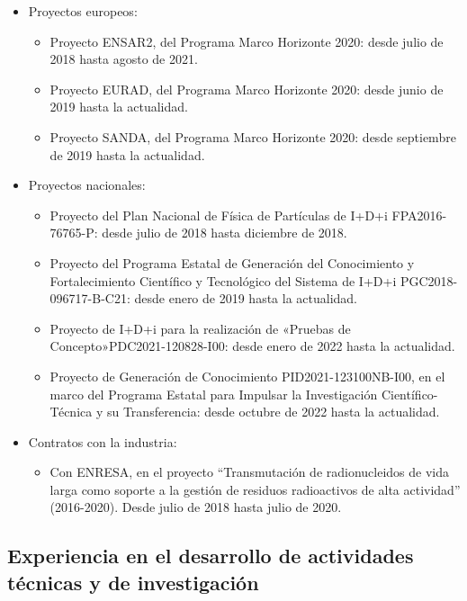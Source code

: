 \documentclass[changecolor={240, 95, 64}]{cv}
\begin{document}
\begin{itemize}
  \item Proyectos europeos:
        \begin{itemize}
          \item Proyecto ENSAR2, del Programa Marco Horizonte 2020: desde julio de 2018 hasta
                agosto de 2021.
          \item Proyecto EURAD, del Programa Marco Horizonte 2020: desde junio de 2019 hasta
                la actualidad.
          \item Proyecto SANDA, del Programa Marco Horizonte 2020: desde septiembre de 2019
                hasta la actualidad.
        \end{itemize}
  \item Proyectos nacionales:
        \begin{itemize}
          \item Proyecto del Plan Nacional de Física de Partículas de I+D+i FPA2016-76765-P: desde julio de 2018 hasta diciembre de 2018.
          \item Proyecto del Programa Estatal de Generación del Conocimiento y Fortalecimiento Científico y Tecnológico del Sistema de I+D+i PGC2018-096717-B-C21: desde enero de 2019 hasta la actualidad.
          \item Proyecto de I+D+i para la realización de «Pruebas de Concepto»PDC2021-120828-I00: desde enero de 2022 hasta la actualidad.
          \item Proyecto de Generación de Conocimiento PID2021-123100NB-I00, en el marco del Programa Estatal para Impulsar la Investigación Científico-Técnica y su Transferencia: desde octubre de 2022 hasta la actualidad.
        \end{itemize}
  \item Contratos con la industria:
        \begin{itemize}
          \item Con ENRESA, en el proyecto “Transmutación de radionucleidos de vida larga como soporte a la gestión de residuos radioactivos de alta actividad” (2016-2020). Desde julio de 2018 hasta julio de 2020.
        \end{itemize}
\end{itemize}

\subsection*{Experiencia en el desarrollo de actividades técnicas y de investigación}
\end{document}
